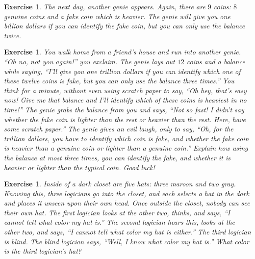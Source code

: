 \documentclass{book}
\newcounter{ekcounter}%
\theoremstyle{ekimcustom}
\newtheorem{exercise}[ekcounter]{Exercise}
\begin{document}
\begin{exercise}
The next day, another genie appears. Again, there are $9$ coins: $8$ genuine coins and a fake coin which is heavier. The genie will give you one billion dollars if you can identify the fake coin, but you can only use the balance twice.
\end{exercise}

\begin{exercise}
You walk home from a friend's house and run into another genie. ``Oh no, not you again!'' you exclaim. The genie lays out $12$ coins and a balance while saying, ``I'll give you one trillion dollars if you can identify which one of these twelve coins is fake, but you can only use the balance three times.'' You think for a minute, without even using scratch paper to say, ``Oh hey, that's \emph{easy} now! Give me that balance and I'll identify which of these coins is heaviest in no time!'' The genie grabs the balance from you and says, ``Not so fast! I didn't say whether the fake coin is lighter than the rest or heavier than the rest. Here, have some scratch paper.'' The genie gives an evil laugh, only to say, ``Oh, for the trillion dollars, you have to identify \emph{which} coin is fake, and whether the fake coin is heavier than a genuine coin or lighter than a genuine coin.'' Explain how using the balance at most three times, you can identify the fake, and whether it is heavier or lighter than the typical coin. Good luck!
\end{exercise}


\begin{exercise}
Inside of a dark closet are five hats: three maroon and two gray. Knowing this, three logicians go into the closet, and each selects a hat in the dark and places it unseen upon their own head. Once outside the closet, nobody can see their own hat. The first logician looks at the other two, thinks, and says, ``I cannot tell what color my hat is.'' The second logician hears this, looks at the other two, and says, ``I cannot tell what color my hat is either.'' The third logician is blind. The blind logician says, ``Well, I know what color my hat is.'' What color is the third logician's hat?
\end{exercise}

\end{document}
